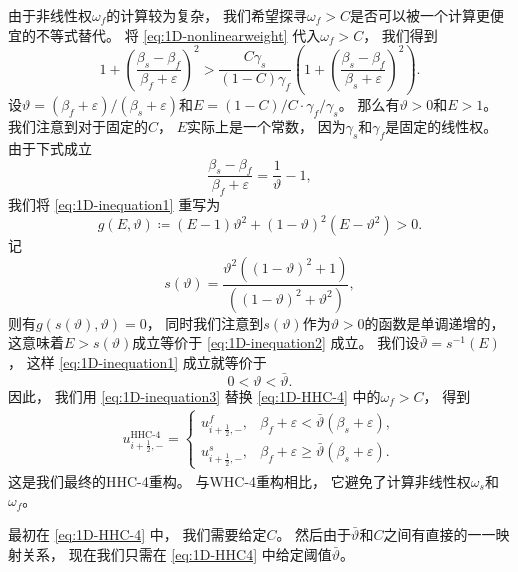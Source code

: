由于非线性权$\omega_{{f}}$的计算较为复杂，
我们希望探寻$\omega_{{f}}> C$是否可以被一个计算更便宜的不等式替代。
将 \cref{eq:1D-nonlinearweight} 代入$\omega_{{f}}> C$，
我们得到
\begin{equation}
  \label{eq:1D-inequation1}
  1+\left(\frac{\beta_{{s}}- \beta_{{f}}}{\beta_{{f}}+ \varepsilon}\right)^2 > \frac{C\gamma_{{s}}}{(1-C)\gamma_{{f}}}\left(1+\left(\frac{\beta_{{s}}- \beta_{{f}}}{\beta_{{s}}+ \varepsilon}\right)^2\right).
\end{equation}
设$\vartheta = (\beta_{{f}}+\varepsilon)/(\beta_{{s}}+\varepsilon)$和$E=(1-C)/C \cdot \gamma_{{f}}/\gamma_{{s}}$。
那么有$\vartheta>0$和$E>1$。
我们注意到对于固定的$C$，
$E$实际上是一个常数，
因为$\gamma_{{s}}$和$\gamma_{{f}}$是固定的线性权。
由于下式成立
\begin{equation}
  \frac{\beta_{{s}}- \beta_{{f}}}{\beta_{{f}}+\varepsilon}=\frac 1\vartheta-1,
\end{equation}
我们将 \cref{eq:1D-inequation1} 重写为
\begin{equation}
  \label{eq:1D-inequation2}
  g(E,\vartheta) \coloneqq (E-1)\vartheta^2+(1-\vartheta)^2(E-\vartheta^2)>0.
\end{equation}
记
\begin{equation}
  s(\vartheta)=\dfrac{\vartheta^2((1-\vartheta)^2+1)}{((1-\vartheta)^2+\vartheta^2)},
\end{equation}
则有$g(s(\vartheta), \vartheta)=0$，
同时我们注意到$s(\vartheta)$作为$\vartheta>0$的函数是单调递增的，
这意味着$E>s(\vartheta)$成立等价于 \cref{eq:1D-inequation2} 成立。
我们设$\bar \vartheta= s^{-1}(E)$，
这样 \cref{eq:1D-inequation1} 成立就等价于
\begin{equation}
  \label{eq:1D-inequation3}
  0<\vartheta<\bar\vartheta.
\end{equation}
因此，
我们用 \cref{eq:1D-inequation3} 替换 \cref{eq:1D-HHC-4} 中的$\omega_{{f}}>C$，
得到
\begin{equation}
  \label{eq:1D-HHC4}
  \begin{aligned}
    u_{i+\frac{1}{2},-}^{\text{HHC-4}}=
    \begin{cases}
      u_{i+\frac{1}{2},-}^{{f}}, & \beta_{{f}}+\varepsilon < \bar{\vartheta}(\beta_{{s}}+\varepsilon),   \\
      u_{i+\frac{1}{2},-}^{{s}}, & \beta_{{f}}+\varepsilon \ge\bar{\vartheta}(\beta_{{s}}+\varepsilon).
    \end{cases}
  \end{aligned}
\end{equation}
这是我们最终的HHC-4重构。
与WHC-4重构相比，
它避免了计算非线性权$\omega_{{s}}$和$\omega_{{f}}$。
\begin{remark}
  最初在 \cref{eq:1D-HHC-4} 中，
  我们需要给定$C$。
  然后由于$\bar\vartheta$和$C$之间有直接的一一映射关系，
  现在我们只需在 \cref{eq:1D-HHC4} 中给定阈值$\bar\vartheta$。
\end{remark}

